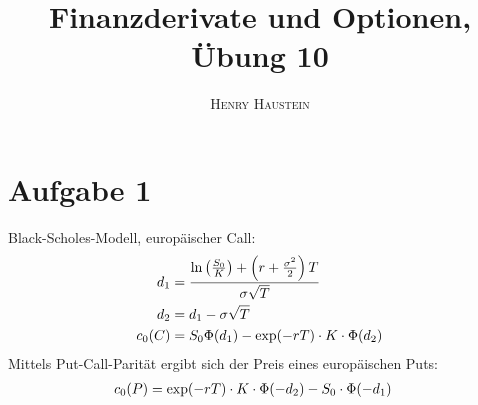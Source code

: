 \documentclass{article}
\title{\textbf{Finanzderivate und Optionen, Übung 10}}
\author{\textsc{Henry Haustein}}
\date{}
\begin{document}
	\maketitle
	
	\section*{Aufgabe 1}
	Black-Scholes-Modell, europäischer Call:
	\begin{align}
		d_1 &= \frac{\ln\left(\frac{S_0}{K}\right) + \left(r+\frac{\sigma^2}{2}\right)T}{\sigma\sqrt{T}} \notag \\
		d_2 &= d_1 - \sigma\sqrt{T} \notag \\
		c_0(C) &= S_0\Phi(d_1) - \exp(-rT)\cdot K\cdot \Phi(d_2) \notag
	\end{align}
	Mittels Put-Call-Parität ergibt sich der Preis eines europäischen Puts:
	\begin{align}
		c_0(P) &= \exp(-rT)\cdot K\cdot\Phi(-d_2) - S_0\cdot\Phi(-d_1) \notag
	\end{align}
\end{document}
